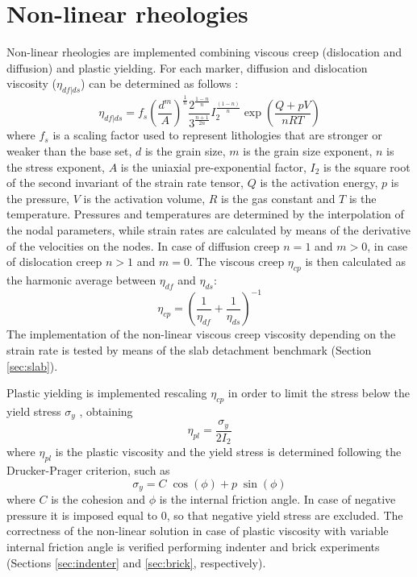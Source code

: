 \documentclass[hidelinks,10pt,a4paper]{article}
\begin{document}
\section{Non-linear rheologies}\label{sec:nonlinear}
Non-linear rheologies are implemented combining viscous creep (dislocation and diffusion) and plastic yielding. For each marker, diffusion and dislocation
viscosity ($\eta_{df|ds}$) can be determined as follows \citep{Karato1993,Wang2016}:
\begin{equation}\label{eq:viscous}
\eta_{df|ds}=f_s \left(\frac{d^m}{A}\right)^{\frac{1}{n}} \frac{2^{\frac{1-n}{n}}}{3^{\frac{n+1}{2n}}} I_2^{\frac{(1-n)}{n}}\exp\left(\frac{Q+pV}{nRT}\right)
\end{equation}
where $f_s$ is a scaling factor used to represent lithologies that are stronger or weaker than the base set, $d$ is the grain size, $m$ is the grain size exponent,
$n$ is the stress exponent, $A$ is the uniaxial pre-exponential factor, $I_2$ is the square root of the second invariant of the strain rate tensor, $Q$ is the
activation energy, $p$ is the pressure, $V$ is the activation volume, $R$ is the gas constant and $T$ is the temperature.
Pressures and temperatures are determined by the interpolation of the nodal parameters, while strain rates are calculated by means of the
derivative of the velocities on the nodes. In case of diffusion creep $n=1$ and $m>0$, in case of dislocation creep $n>1$ and $m=0$. The viscous creep $\eta_{cp}$
is then calculated as the harmonic average between $\eta_{df}$ and $\eta_{ds}$:
\begin{equation}\label{eq:visco_creep}
\eta_{cp}=\left(\frac{1}{\eta_{df}}+\frac{1}{\eta_{ds}}\right)^{-1}
\end{equation}
The implementation of the non-linear viscous creep viscosity depending on the strain rate is tested by means of the slab detachment benchmark
(Section \ref{sec:slab}).

Plastic yielding is implemented rescaling $\eta_{cp}$ in order to limit the stress below the yield stress $\sigma_y$ \citep{Thieulot2008,Thieulot2014,Glerum2018},
obtaining
\begin{equation}\label{eq:plastic}
\eta_{pl}=\frac{\sigma_y}{2I_2}
\end{equation}
where $\eta_{pl}$ is the plastic viscosity and the yield stress is determined following the Drucker-Prager criterion, such as
\begin{equation}\label{eq:yield}
\sigma_y=C\;\cos(\phi)+p\;\sin(\phi)
\end{equation}
where $C$ is the cohesion and $\phi$ is the internal friction angle. In case of negative pressure it is imposed equal to 0, so that negative yield stress are
excluded. The correctness of the non-linear solution in case of plastic viscosity with variable internal friction angle is verified performing indenter and
brick experiments (Sections \ref{sec:indenter} and \ref{sec:brick}, respectively).
\end{document}

